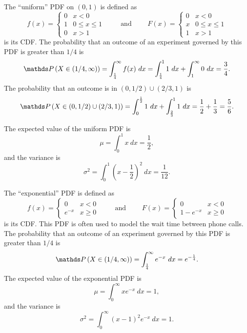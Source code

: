 \begin{exampleblock}[breakable]
The ``uniform'' PDF on $(0,1)$ is defined as
$$f(x)=\begin{cases}0 & x < 0\\ 1 & 0\leq x\leq 1\\ 0 & x>1\end{cases}
\quad\quad\text{ and } \quad\quad
F(x)=\begin{cases}0 & x < 0\\ x & 0\leq x\leq 1\\ 1 & x>1\end{cases}$$
is its CDF. The probability that an outcome of an experiment governed by this PDF is greater than $1/4$ is
$$\P\left(X\in(1/4,\infty)\right)
= \int_{\frac14}^{\infty}f(x)\ dx
= \int_{\frac14}^{1}1\ dx + \int_{1}^{\infty}0\ dx
= \frac34.
$$
The probability that an outcome is in $(0,1/2)\cup(2/3,1)$ is
$$\P\left(X\in(0,1/2)\cup(2/3,1)\right)
= \int_0^{\frac12}1\ dx + \int_{\frac23}^11\ dx
= \frac12+\frac13 = \frac56.
$$

The expected value of the uniform PDF is
$$\mu=\int_{0}^1 x\ dx=\frac{1}{2},$$
and the variance is
$$\sigma^2 = \int_{0}^1 \left(x-\frac{1}{2}\right)^2\ dx=\frac{1}{12}.$$
\end{exampleblock}

\begin{exampleblock}
The ``exponential'' PDF is defined as
$$f(x)=\begin{cases}0 & x < 0\\ e^{-x} & x\geq 0\end{cases}
\quad\quad\text{ and } \quad\quad
F(x)=\begin{cases}0 & x < 0\\1- e^{-x} & x\geq 0\end{cases}$$
is its CDF. This PDF is often used to model the wait time between phone calls. The probability that an outcome of an experiment governed by this PDF is greater than $1/4$ is
$$\P\left(X\in(1/4,\infty)\right)
= \int_{\frac14}^{\infty} e^{-x}\ dx
= e^{-\frac{1}{4}}.
$$
The expected value of the exponential PDF is
$$\mu=\int_{0}^\infty xe^{-x}\ dx=1,$$
and the variance is
$$\sigma^2 = \int_{0}^\infty \left(x-1\right)^2e^{-x}\ dx=1.$$

\end{exampleblock}


